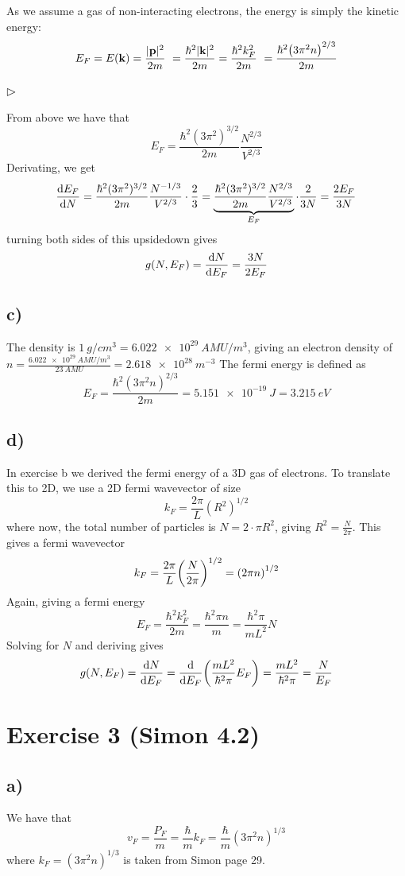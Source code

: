 \documentclass[12p,a4paper]{article}
\renewcommand{\b}[1]{\boldsymbol{\mathrm{#1}}}
\begin{document}
As we assume a gas of non-interacting electrons, the energy is simply the kinetic energy:
\[
    E_F = E(\b k) = \frac{|\b p|^2}{2m} = \frac{\hbar^2|\b k|^2}{2m} = \frac{\hbar^2 k_F^2}{2m} = \frac{\hbar^2\qty(3\pi^2 n)^{2/3}}{2m}
\]


\subsubsection*{$\rhd$}
From above we have that
\[
    E_F = \frac{\hbar^2(3\pi^2)^{3/2}}{2m}\frac{N^{2/3}}{V^{2/3}}
\]
Derivating, we get
\[
    \dv{E_F}{N} = \frac{\hbar^2(3\pi^2)^{3/2}}{2m}\frac{N^{-1/3}}{V^{2/3}}\cdot \frac{2}{3} = \underbrace{\frac{\hbar^2(3\pi^2)^{3/2}}{2m}\frac{N^{2/3}}{V^{2/3}}}_{E_F} \cdot \frac{2}{3N} = \frac{2E_F}{3N}
\]
turning both sides of this upsidedown gives
\[
    g(N, E_F) = \dv{N}{E_F} = \frac{3N}{2E_F}
\]


\subsection*{c)}
The density is $\SI{1}{g/cm^3} = \SI{6.022e29}{AMU/m^3}$, giving an electron density of $n = \frac{\SI{6.022e29}{AMU/m^3}}{\SI{23}{AMU}} = \SI{2.618e28}{m^{-3}}$ 
The fermi energy is defined as
\[
    E_F = \frac{\hbar^2(3\pi^2 n)^{2/3}}{2m} = \SI{5.151e-19}{J} = \SI{3.215}{eV}
\]



\subsection*{d)}
In exercise b we derived the fermi energy of a 3D gas of electrons. To translate this to 2D, we use a 2D fermi wavevector of size
\[
    k_F = \frac{2\pi}{L}(R^2)^{1/2}
\]
where now, the total number of particles is $N = 2\cdot \pi R^2$, giving $R^2 = \frac{N}{2\pi}$. This gives a fermi wavevector
\[
    k_F = \frac{2\pi}{L}\qty(\frac{N}{2\pi})^{1/2} = \qty(2\pi n)^{1/2}
\]
Again, giving a fermi energy
\[
    E_F = \frac{\hbar^2 k_F^2}{2m} = \frac{\hbar^2 \pi n}{m} = \frac{\hbar^2\pi}{mL^2}N
\]
Solving for $N$ and deriving gives
\[
    g(N, E_F) = \dv{N}{E_F} = \dv{E_F}\qty(\frac{mL^2}{\hbar^2 \pi}E_F) = \frac{mL^2}{\hbar^2 \pi} = \frac{N}{E_F}
\]

\section*{Exercise 3 (Simon 4.2)}
\subsection*{a)}
We have that
\[
    v_F = \frac{P_F}{m} = \frac{\hbar}{m}k_F = \frac{\hbar}{m}(3\pi^2n)^{1/3}
\]
where $k_F = (3\pi^2n)^{1/3}$ is taken from Simon page 29.
\end{document}
